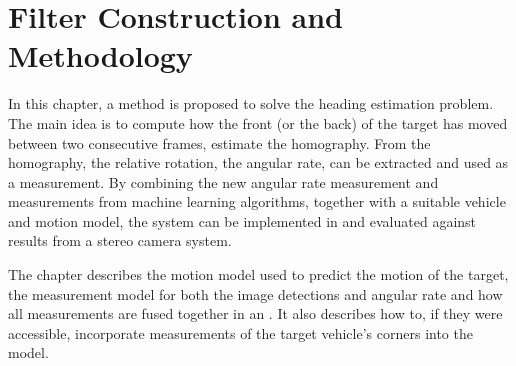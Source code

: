 \chapter{Filter Construction and Methodology}
\label{cha:method}

In this chapter, a method is proposed to solve the heading estimation problem.
The main idea is to compute how the front (or the back) of the target has moved between two consecutive frames, \ie estimate the homography.
From the homography, the relative rotation, \ie the angular rate, can be extracted and used as a measurement.
By combining the new angular rate measurement and \abbrROI measurements from machine learning algorithms, together with a suitable vehicle and motion model, the system can be implemented in \matlab and evaluated against results from a stereo camera system.

The chapter describes the motion model used to predict the motion of the target, the measurement model for both the image detections and angular rate and how all measurements are fused together in an \abbrEKF.
It also describes how to, if they were accessible, incorporate measurements of the target vehicle's corners into the model.

